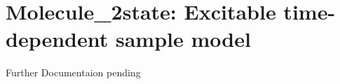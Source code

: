\section{Molecule\_2state: Excitable time-dependent sample model}
\label{molecule_2state}


Further Documentaion pending
